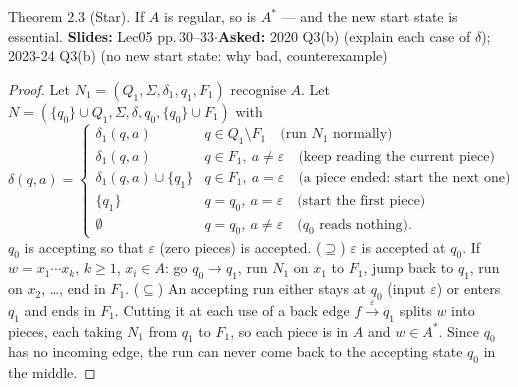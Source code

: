 \documentclass[10.5pt,a4paper]{article}
\newcommand{\src}[2]{{\footnotesize\color{gray!70!black}\textbf{Slides:} #1\enspace$\cdot$\enspace\textbf{Asked:} #2}\par}
\newcommand{\eps}{\varepsilon}
\begin{document}
\begin{thm}{Theorem 2.3 (Star). If $A$ is regular, so is $A^*$ --- and the new start state is essential.}
\src{Lec05 pp.\,30--33}{2020 Q3(b) (explain each case of $\delta$); 2023-24 Q3(b) (no new start state: why bad, counterexample)}
\end{thm}
\begin{proof}
Let $N_1=(Q_1,\Sigma,\delta_1,q_1,F_1)$ recognise $A$. Let $N=(\{q_0\}\cup Q_1,\Sigma,\delta,q_0,\{q_0\}\cup F_1)$ with
\[\delta(q,a)=\begin{cases}
\delta_1(q,a) & q\in Q_1\setminus F_1 \quad\text{(run $N_1$ normally)}\\
\delta_1(q,a) & q\in F_1,\ a\ne\eps \quad\text{(keep reading the current piece)}\\
\delta_1(q,a)\cup\{q_1\} & q\in F_1,\ a=\eps \quad\text{(a piece ended: start the next one)}\\
\{q_1\} & q=q_0,\ a=\eps \quad\text{(start the first piece)}\\
\emptyset & q=q_0,\ a\ne\eps \quad\text{($q_0$ reads nothing).}
\end{cases}\]
$q_0$ is accepting so that $\eps$ (zero pieces) is accepted.
($\supseteq$) $\eps$ is accepted at $q_0$. If $w=x_1\cdots x_k$, $k\ge1$, $x_i\in A$: go $q_0\to q_1$, run $N_1$ on $x_1$ to $F_1$, jump back
to $q_1$, run on $x_2$, \dots, end in $F_1$. ($\subseteq$) An accepting run either stays at $q_0$ (input $\eps$) or enters $q_1$ and ends in
$F_1$. Cutting it at each use of a back edge $f\xrightarrow{\eps}q_1$ splits $w$ into pieces, each taking $N_1$ from $q_1$ to $F_1$, so
each piece is in $A$ and $w\in A^*$. Since $q_0$ has no incoming edge, the run can never come back to the accepting state $q_0$
in the middle.
\end{proof}
\end{document}
